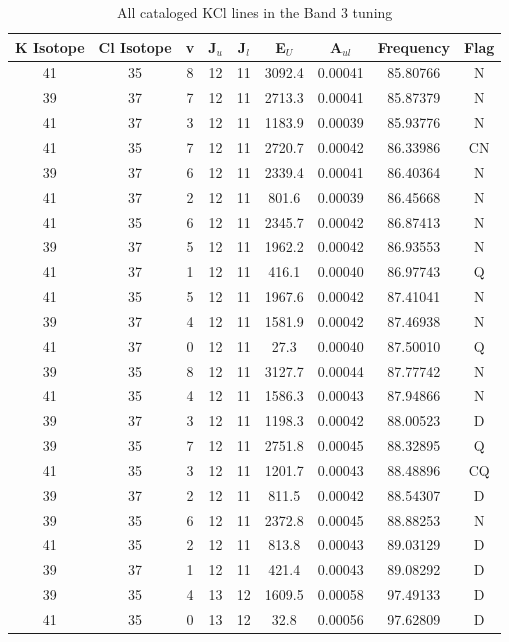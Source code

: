 \begin{table*}[htp]
\centering
\caption{All cataloged KCl lines in the Band 3 tuning}
\begin{tabular}{ccccccccc}
\label{tab:K_detections_B3}
K Isotope & Cl Isotope & v & J$_u$ & J$_l$ & E$_U$ & A$_{ul}$ & Frequency & Flag \\
\hline
41 & 35 & 8 & 12 & 11 & 3092.4 & 0.00041 & 85.80766 & N \\
39 & 37 & 7 & 12 & 11 & 2713.3 & 0.00041 & 85.87379 & N \\
41 & 37 & 3 & 12 & 11 & 1183.9 & 0.00039 & 85.93776 & N \\
41 & 35 & 7 & 12 & 11 & 2720.7 & 0.00042 & 86.33986 & CN \\
39 & 37 & 6 & 12 & 11 & 2339.4 & 0.00041 & 86.40364 & N \\
41 & 37 & 2 & 12 & 11 & 801.6 & 0.00039 & 86.45668 & N \\
41 & 35 & 6 & 12 & 11 & 2345.7 & 0.00042 & 86.87413 & N \\
39 & 37 & 5 & 12 & 11 & 1962.2 & 0.00042 & 86.93553 & N \\
41 & 37 & 1 & 12 & 11 & 416.1 & 0.00040 & 86.97743 & Q \\
41 & 35 & 5 & 12 & 11 & 1967.6 & 0.00042 & 87.41041 & N \\
39 & 37 & 4 & 12 & 11 & 1581.9 & 0.00042 & 87.46938 & N \\
41 & 37 & 0 & 12 & 11 & 27.3 & 0.00040 & 87.50010 & Q \\
39 & 35 & 8 & 12 & 11 & 3127.7 & 0.00044 & 87.77742 & N \\
41 & 35 & 4 & 12 & 11 & 1586.3 & 0.00043 & 87.94866 & N \\
39 & 37 & 3 & 12 & 11 & 1198.3 & 0.00042 & 88.00523 & D \\
39 & 35 & 7 & 12 & 11 & 2751.8 & 0.00045 & 88.32895 & Q \\
41 & 35 & 3 & 12 & 11 & 1201.7 & 0.00043 & 88.48896 & CQ \\
39 & 37 & 2 & 12 & 11 & 811.5 & 0.00042 & 88.54307 & D \\
39 & 35 & 6 & 12 & 11 & 2372.8 & 0.00045 & 88.88253 & N \\
41 & 35 & 2 & 12 & 11 & 813.8 & 0.00043 & 89.03129 & D \\
39 & 37 & 1 & 12 & 11 & 421.4 & 0.00043 & 89.08292 & D \\
39 & 35 & 4 & 13 & 12 & 1609.5 & 0.00058 & 97.49133 & D \\
41 & 35 & 0 & 13 & 12 & 32.8 & 0.00056 & 97.62809 & D \\

\end{tabular}
\end{table*}
